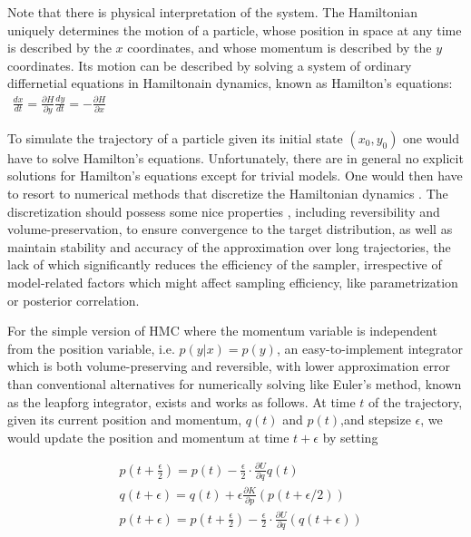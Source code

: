 \documentclass{book}
\begin{document}
\begin{enumerate}
Note that there is physical interpretation of the system. The Hamiltonian uniquely determines the motion of a particle, whose position in space at any time is described by the $x$ coordinates, and whose momentum is described by the $y$ coordinates. Its motion can be described by solving a system of ordinary differnetial equations in Hamiltonain dynamics, known as Hamilton's equations:
$
\begin{align}
    \frac{dx}{dt} = \frac{\partial H}{\partial y }
    \frac{dy}{dt} = -\frac{\partial H}{\partial x}
\end{align}
$


To simulate the trajectory of a particle given its initial state $(x_0,y_0)$ one
would have to solve Hamilton's equations. Unfortunately, there are in general no
explicit solutions for Hamilton's equations except for trivial models. One would
then have to resort to numerical methods that discretize the Hamiltonian
dynamics \cite{leimkuhler2004simulating}. The discretization should
possess some nice properties , including reversibility and volume-preservation, to ensure convergence to the target distribution, as well as  maintain 
stability and accuracy of the approximation over long trajectories, the lack of which significantly reduces the efficiency of the sampler, irrespective of model-related factors which might affect sampling efficiency, like parametrization or posterior correlation.  

For the simple version of HMC where the momentum variable is independent from the position variable, i.e. $p(y|x)=p(y)$, an easy-to-implement integrator which is both volume-preserving and reversible, with lower approximation error than conventional alternatives for numerically solving like Euler's method, known as the leapforg integrator, exists and works as follows. At time $t$ of the trajectory, given its current position and momentum, $q(t)$ and $p(t)$,and stepsize $\epsilon$, we would update the position and momentum at time $t+\epsilon$ by setting 

\begin{align}
    &p(t+\frac{\epsilon}{2}) = p(t) - \frac{\epsilon}{2}\cdot \frac{\partial
    U}{\partial
    q}q(t) \\
    &q(t+\epsilon) = q(t) + \epsilon  \frac{\partial K}{\partial p}(p(t+\epsilon/2))
    \\
    &p(t+\epsilon) = p(t + \frac{\epsilon}{2}) - \frac{\epsilon} {2} \cdot \frac{\partial U}{\partial
    q}(q(t+\epsilon))
\end{align}


\end{enumerate}
\end{document}
